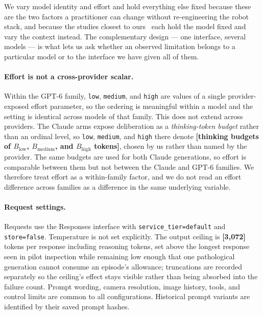 \documentclass[11pt]{article}
\newcommand{\placeholder}[1]{\textbf{[#1]}}
\begin{document}
We vary model identity and effort and hold everything else fixed because these
are the two factors a practitioner can change without re-engineering the robot
stack, and because the studies closest to
ours~\citep{galbot2026astra,roboicl2026,vlmagents2026} each hold the model
fixed and vary the context instead. The complementary design --- one interface,
several models --- is what lets us ask whether an observed limitation belongs
to a particular model or to the interface we have given all of them.

\paragraph{Effort is not a cross-provider scalar.}
Within the GPT-6 family, \texttt{low}, \texttt{medium}, and \texttt{high} are
values of a single provider-exposed effort parameter, so the ordering is
meaningful within a model and the setting is identical across models of that
family. This does not extend across providers. The Claude arms expose
deliberation as a \emph{thinking-token budget} rather than an ordinal level, so
\texttt{low}, \texttt{medium}, and \texttt{high} there denote
\placeholder{thinking budgets of $B_{\text{low}}$, $B_{\text{medium}}$, and
$B_{\text{high}}$ tokens}, chosen by us rather than named by the provider. The
same budgets are used for both Claude generations, so effort is comparable
between them but not between the Claude and GPT-6 families. We therefore treat
effort as a within-family factor, and we do not read an effort difference
across families as a difference in the same underlying variable.

\paragraph{Request settings.}
Requests use the Responses interface with \texttt{service\_tier=default} and
\texttt{store=false}. Temperature is not set explicitly. The output ceiling is
\placeholder{3{,}072} tokens per response including reasoning tokens, set above
the longest response seen in pilot inspection while remaining low enough that
one pathological generation cannot consume an episode's allowance;
truncations are recorded separately so the ceiling's effect stays visible
rather than being absorbed into the failure count. Prompt wording, camera
resolution, image history, tools, and control limits are common to all
configurations. Historical prompt variants are identified by their saved
prompt hashes.
\end{document}
